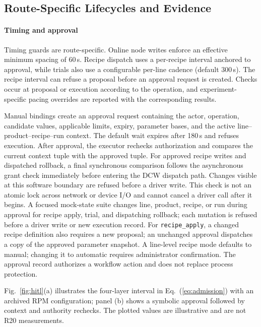 \subsection{Route-Specific Lifecycles and Evidence}
\label{sec:routes}
\label{sec:mech}
\label{sec:objective}
\label{sec:nodeexec}
\label{sec:ack}

\paragraph{Timing and approval}
Timing guards are route-specific. Online node writes enforce an effective
minimum spacing of 60\,s. Recipe dispatch uses a per-recipe interval anchored
to approval, while trials also use a configurable per-line cadence (default
300\,s). The recipe interval can refuse a proposal before an approval request
is created. Checks occur at proposal or execution according to the operation,
and experiment-specific pacing overrides are reported with the corresponding
results.

Manual bindings create an approval request containing the actor, operation,
candidate values, applicable limits, expiry, parameter bases, and the active
line--product--recipe--run context. The default wait expires after 180\,s and
refuses execution. After approval, the executor rechecks authorization and
compares the current context tuple with the approved tuple. For approved
recipe writes and dispatched rollback, a final synchronous comparison follows
the asynchronous grant check immediately before entering the DCW dispatch
path. Changes visible at this software boundary are refused before a driver
write. This check is not an atomic lock across network or device I/O and
cannot cancel a driver call after it begins. A focused mock-state suite
changes line, product, recipe, or run during approval for recipe apply, trial,
and dispatching rollback; each mutation is refused before a driver write or
new execution record. For
\texttt{recipe\_apply}, a changed recipe definition also requires a new
proposal; an unchanged approval dispatches a copy of the approved parameter
snapshot. A line-level recipe mode defaults to manual; changing it to
automatic requires administrator confirmation. The approval record
authorizes a workflow action and does not replace process protection.

Fig.~\ref{fig:hitl}(a) illustrates the four-layer interval in
Eq.~(\ref{eq:admission}) with an archived RPM configuration; panel (b) shows a
symbolic approval followed by context and authority rechecks. The plotted
values are illustrative and are not R20 measurements.

